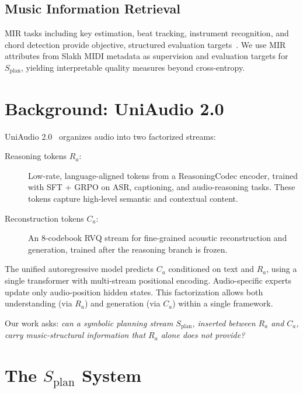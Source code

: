 \documentclass[11pt]{article}
\newcommand{\splan}{$S_{\mathrm{plan}}$}
\newcommand{\splanmath}{S_{\mathrm{plan}}}
\newcommand{\Ramath}{R_a}
\newcommand{\Camath}{C_a}
\begin{document}
\subsection{Music Information Retrieval}

MIR tasks including key estimation, beat tracking, instrument recognition, and chord
detection provide objective, structured evaluation targets~\citep{raffel2014mir_eval}.
We use MIR attributes from Slakh MIDI metadata as supervision and evaluation targets for
\splan{}, yielding interpretable quality measures beyond cross-entropy.

\section{Background: UniAudio 2.0}

UniAudio 2.0~\citep{yang2026uniaudio2} organizes audio into two factorized streams:

\begin{description}
  \item[Reasoning tokens $\Ramath$:] Low-rate, language-aligned tokens from a
    ReasoningCodec encoder, trained with SFT + GRPO on ASR, captioning, and
    audio-reasoning tasks.  These tokens capture high-level semantic and contextual
    content.
  \item[Reconstruction tokens $\Camath$:] An 8-codebook RVQ stream for fine-grained
    acoustic reconstruction and generation, trained after the reasoning branch is frozen.
\end{description}

The unified autoregressive model predicts $\Camath$ conditioned on text and $\Ramath$,
using a single transformer with multi-stream positional encoding.
Audio-specific experts update only audio-position hidden states.
This factorization allows both understanding (via $\Ramath$) and generation
(via $\Camath$) within a single framework.

Our work asks: \emph{can a symbolic planning stream $\splanmath$, inserted between
$\Ramath$ and $\Camath$, carry music-structural information that $\Ramath$ alone does
not provide?}

\section{The \texorpdfstring{\splan{}}{S-plan} System}
\end{document}
